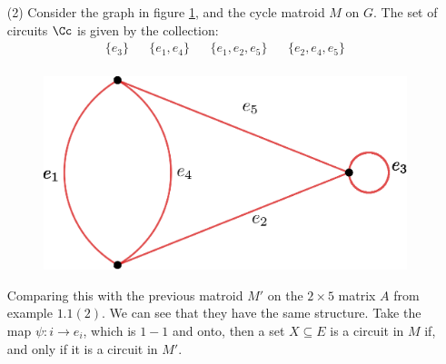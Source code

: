 \begin{example}
\begin{enumerate}
        \item[(2)] Consider the graph in figure \ref{fig_1.2}, and the cycle
            matroid $M$ on $G$. The set of circuits  $\Cc$ is given by the
            collection:
            \begin{align*}
                \{e_3\} && \{e_1,e_4\} && \{e_1, e_2, e_5\} && \{e_2,e_4,e_5\} \\
            \end{align*}
            \begin{figure}[h]
                \centering
                \includegraphics[scale=0.5]{Figures/Chapter1/graphic_matroid.eps}
                \caption{}
                \label{fig_1.2}
            \end{figure}
            Comparing this with the previous matroid $M'$ on the $2 \times 5$
            matrix $A$ from example $1.1(2)$. We can see that they have the same
            structure. Take the map $\psi:i \rightarrow e_i$, which is $1-1$ and
             onto, then a set  $X \subseteq E$ is a circuit in  $M$ if, and only
             if it is a circuit in $M'$.
    \end{enumerate}
\end{example}

